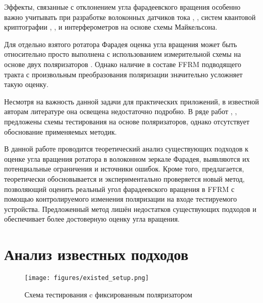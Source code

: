 \documentclass{article}
\begin{document}
Эффекты, связанные с отклонением угла фарадеевского вращения особенно важно учитывать при разработке волоконных датчиков тока \autocite{karabulutEffectFaradayMirror2019}, \autocite{wuInfluenceImperfectFaraday2022}, систем квантовой криптографии \autocite{wangEffectImperfectFaraday2013}, \autocite{sunPassiveFaradaymirrorAttack2011},\autocite{liangSecurityAnalysisContinuousvariable2019} и интерферометров на основе схемы Майкельсона.

Для отдельно взятого ротатора Фарадея оценка угла вращения может быть относительно просто выполнена с использованием измерительной схемы на основе двух поляризаторов \autocite{yinFaradayAngleAccuracy2022}. Однако наличие в составе FFRM подводящего тракта с произвольным преобразования поляризации значительно усложняет такую оценку.

Несмотря на важность данной задачи для практических приложений, в известной авторам литературе она освещена недостаточно подробно. В ряде работ \autocite{wanTwoinoneFaradayRotator2014}, \autocite{sunAllFiberOpticalFaraday2010},  \autocite{sunCompactAllfiberOptical2010} предложены схемы тестирования на основе поляризаторов, однако отсутствует обоснование применяемых методик.

В данной работе проводится теоретический анализ существующих подходов к оценке угла вращения ротатора в волоконном зеркале Фарадея, выявляются их потенциальные ограничения и источники ошибок. Кроме того, предлагается, теоретически обосновывается и экспериментально проверяется новый метод, позволяющий оценить реальный угол фарадеевского вращения в FFRM с помощью контролируемого изменения поляризации на входе тестируемого устройства. Предложенный метод лишён недостатков существующих подходов и обеспечивает более достоверную оценку угла вращения.

\section{Анализ известных подходов}
\begin{figure}[b]
	\centering
	\texttt{[image: figures/existed\_setup.png]}
	\caption{Схема тестирования c фиксированным поляризатором}
	\label{fig:existed_setup}
\end{figure}
\end{document}
